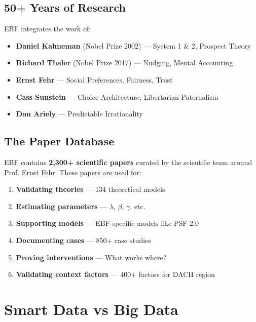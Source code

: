 \subsection{50+ Years of Research}

EBF integrates the work of:
\begin{itemize}[nosep]
\item \textbf{Daniel Kahneman} (Nobel Prize 2002) --- System 1 \& 2, Prospect Theory
\item \textbf{Richard Thaler} (Nobel Prize 2017) --- Nudging, Mental Accounting
\item \textbf{Ernst Fehr} --- Social Preferences, Fairness, Trust
\item \textbf{Cass Sunstein} --- Choice Architecture, Libertarian Paternalism
\item \textbf{Dan Ariely} --- Predictable Irrationality
\end{itemize}

\subsection{The Paper Database}

EBF contains \textbf{2,300+ scientific papers} curated by the scientific team
around Prof. Ernst Fehr. These papers are used for:

\begin{enumerate}
\item \textbf{Validating theories} --- 134 theoretical models
\item \textbf{Estimating parameters} --- $\lambda$, $\beta$, $\gamma$, etc.
\item \textbf{Supporting models} --- EBF-specific models like PSF-2.0
\item \textbf{Documenting cases} --- 850+ case studies
\item \textbf{Proving interventions} --- What works where?
\item \textbf{Validating context factors} --- 400+ factors for DACH region
\end{enumerate}


\section{Smart Data vs Big Data}
\label{sec:ref-ebf-smartdata}

